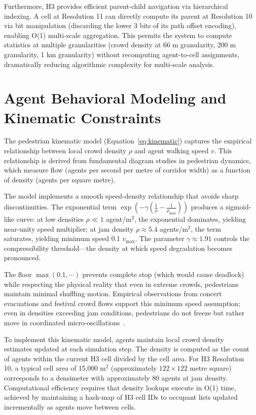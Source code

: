 \documentclass[12pt,a4paper,oneside]{report}
\begin{document}
Furthermore, H3 provides efficient parent-child navigation via hierarchical indexing. A cell at Resolution 11 can directly compute its parent at Resolution 10 via bit manipulation (discarding the lower 3 bits of its path offset encoding), enabling O(1) multi-scale aggregation. This permits the system to compute statistics at multiple granularities (crowd density at 66 m granularity, 200 m granularity, 1 km granularity) without recomputing agent-to-cell assignments, dramatically reducing algorithmic complexity for multi-scale analysis.

\section{Agent Behavioral Modeling and Kinematic Constraints}
The pedestrian kinematic model (Equation~\ref{eq:kinematic}) captures the empirical relationship between local crowd density $\rho$ and agent walking speed $v$. This relationship is derived from fundamental diagram studies in pedestrian dynamics, which measure flow (agents per second per metre of corridor width) as a function of density (agents per square metre).

The model implements a smooth speed-density relationship that avoids sharp discontinuities. The exponential term $\exp(-\gamma(\frac{1}{\rho} - \frac{1}{\rho_{\max}}))$ produces a sigmoid-like curve: at low densities $\rho \ll 1$ agent/m$^2$, the exponential dominates, yielding near-unity speed multiplier; at jam density $\rho \approx 5.4$ agents/m$^2$, the term saturates, yielding minimum speed 0.1 $v_{\max}$. The parameter $\gamma \approx 1.91$ controls the compressibility threshold—the density at which speed degradation becomes pronounced.

The floor $\max(0.1, \cdots)$ prevents complete stop (which would cause deadlock) while respecting the physical reality that even in extreme crowds, pedestrians maintain minimal shuffling motion. Empirical observations from concert evacuations and festival crowd flows support this minimum speed assumption; even in densities exceeding jam conditions, pedestrians do not freeze but rather move in coordinated micro-oscillations~\cite{schadschneider2009evacuation}.

To implement this kinematic model, agents maintain local crowd density estimates updated at each simulation step. The density is computed as the count of agents within the current H3 cell divided by the cell area. For H3 Resolution 10, a typical cell area of 15,000 m$^2$ (approximately $122 \times 122$ metre square) corresponds to a densimeter with approximately 80 agents at jam density. Computational efficiency requires that density lookups execute in O(1) time, achieved by maintaining a hash-map of H3 cell IDs to occupant lists updated incrementally as agents move between cells.
\end{document}
